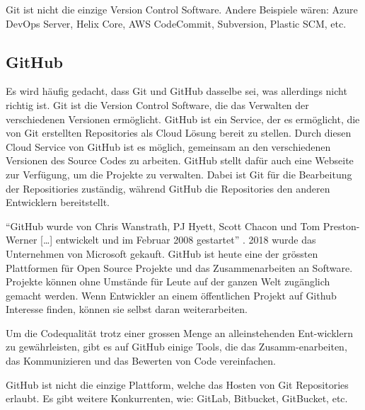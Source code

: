 Git ist nicht die einzige Version Control Software. Andere Beispiele wären:
Azure DevOps Server, Helix Core, AWS CodeCommit, Subversion, Plastic SCM, etc. 
\cite{noauthor_git_nodate-1}

\subsection*{GitHub}
Es wird häufig gedacht, dass Git und GitHub dasselbe sei, was allerdings nicht
richtig ist. Git ist die Version Control Software, die das Verwalten der
verschiedenen Versionen ermöglicht. GitHub ist ein Service, der es ermöglicht,
die von Git erstellten Repositories als Cloud Lösung bereit zu stellen. Durch
diesen Cloud Service von GitHub ist es möglich, gemeinsam an den verschiedenen
Versionen des Source Codes zu arbeiten. GitHub stellt dafür auch eine Webseite
zur Verfügung, um die Projekte zu verwalten. Dabei ist Git für die Bearbeitung
der Repositiories zuständig, während GitHub die Repositories den anderen
Entwicklern bereitstellt.
\cite{noauthor_github_2021} 

``GitHub wurde von Chris Wanstrath, PJ Hyett, Scott Chacon und Tom Preston-Werner
[\ldots] entwickelt und im Februar 2008 gestartet'' \cite{noauthor_github_2021}.
2018 wurde das Unternehmen von Microsoft gekauft. GitHub ist heute eine der
grössten Plattformen für Open Source Projekte und das Zusammenarbeiten an
Software. Projekte können ohne Umstände für Leute auf der ganzen Welt zugänglich
gemacht werden. Wenn Entwickler an einem öffentlichen Projekt auf Github
Interesse finden, können sie selbst daran weiterarbeiten. 
\cite{noauthor_github_2021}

Um die Codequalität trotz einer grossen Menge an alleinstehenden Ent\hyp{}wicklern zu
gewährleisten, gibt es auf GitHub einige Tools, die das Zusamm\hyp{}enarbeiten, das
Kommunizieren und das Bewerten von Code vereinfachen.

GitHub ist nicht die einzige Plattform, welche das Hosten von Git Repositories
erlaubt. Es gibt weitere Konkurrenten, wie: GitLab, Bitbucket, GitBucket, etc.
\cite{noauthor_top_2021}
